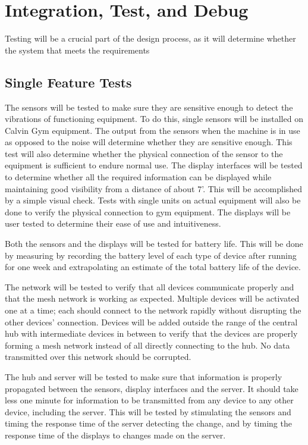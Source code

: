 \documentclass[PPFS.tex]{template/subfiles}
\begin{document}
\section{Integration, Test, and Debug}
Testing will be a crucial part of the design process, as it will determine whether the system that meets the requirements 

\subsection{Single Feature Tests}
The sensors will be tested to make sure they are sensitive enough to detect the vibrations of functioning equipment.  To do this, single sensors will be installed on Calvin Gym equipment. The output from the sensors when the machine is in use as opposed to the noise will determine whether they are sensitive enough. This test will also determine whether the physical connection of the sensor to the equipment is sufficient to endure normal use.
The display interfaces will be tested to determine whether all the required information can be displayed while maintaining good visibility from a distance of about 7'. This will be accomplished by a simple visual check. Tests with single units on actual equipment will also be done to verify the physical connection to gym equipment. The displays will be user tested to determine their ease of use and intuitiveness.

Both the sensors and the displays will be tested for battery life. This will be done by measuring by recording the battery level of each type of device after running for one week and extrapolating an estimate of the total battery life of the device.

The network will be tested to verify that all devices communicate properly and that the mesh network is working as expected. Multiple devices will be activated one at a time; each should connect to the network rapidly without disrupting the other devices’ connection. Devices will be added outside the range of the central hub with intermediate devices in between to verify that the devices are properly forming a mesh network instead of all directly connecting to the hub. No data transmitted over this network should be corrupted.

The hub and server will be tested to make sure that information is properly propagated between the sensors, display interfaces and the server. It should take less one minute for information to be transmitted from any device to any other device, including the server. This will be tested by stimulating the sensors and timing the response time of the server detecting the change, and by timing the response time of the displays to changes made on the server. 
\end{document}
